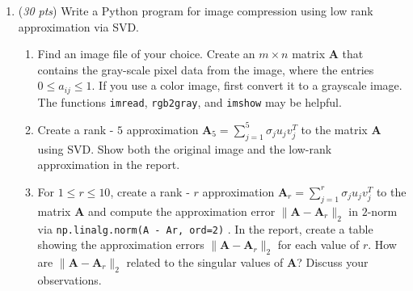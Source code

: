 \documentclass[10pt,twoside]{article}
\def\mb{\mathbf}
\begin{document}
\begin{enumerate}
\newpage
\item (\emph{30 pts}) Write a Python program for image compression using low rank approximation via SVD.
\begin{enumerate}
\item Find an image file of your choice. Create an $m\times n$ matrix $\mb{A}$ that contains the gray-scale pixel data from the image, where the entries $0\le a_{ij}\le 1$. If you use a color image, first convert it to a grayscale image. The functions \texttt{imread}, \texttt{rgb2gray}, and \texttt{imshow} may be helpful.
\item Create a rank - $5$ approximation $\mb{A}_5 = \sum_{j=1}^{5}\sigma_j u_j v_j^{T}$ to the matrix $\mb{A}$ using SVD. Show both the original image and the low-rank approximation in the report.
\item For $1 \le r \le 10$, create a rank - $r$ approximation $\mb{A}_r = \sum_{j=1}^{r}\sigma_j u_j v_j^{T}$ to the matrix $\mb{A}$ and compute the approximation error $\|\mb{A}-\mb{A}_r\|_2$ in $2$-norm via \texttt{np.linalg.norm(A - Ar, ord=2)} . In the report, create a table showing the approximation errors $\|\mb{A}-\mb{A}_r\|_2$ for each value of $r$. How are $\|\mb{A}-\mb{A}_r\|_2$ related to the singular values of $\mb{A}$? Discuss your observations.
\end{enumerate} 



\end{enumerate}

\end{document}
